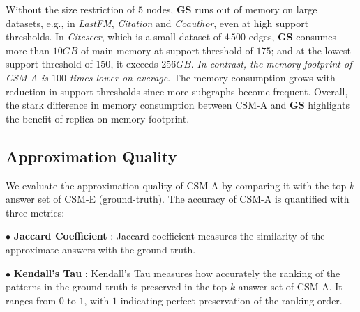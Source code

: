 Without the size restriction of $5$ nodes, \textbf{GS} runs out of memory on large datasets, e.g., in {\em LastFM}, {\em Citation} and {\em Coauthor}, even at high support thresholds. In {\em Citeseer}, which is a small dataset of $4\,500$ edges, \textbf{GS} consumes more than $10GB$ of main memory at support threshold of $175$; and at the lowest support threshold of $150$, it exceeds $256GB$. {\em In contrast, the memory footprint of {\sf CSM-A} is $100$ times lower on average}. The memory consumption grows with reduction in support thresholds since more subgraphs become frequent. Overall, the stark difference in memory consumption between {\sf CSM-A} and \textbf{GS} highlights the benefit of replica on memory footprint.%
\vspace{-0.1in}
\subsection{Approximation Quality}
\label{sec:quality}
We evaluate the approximation quality of {\sf CSM-A} by comparing it with the top-$k$ answer set of {\sf CSM-E} (ground-truth). The accuracy of {\sf CSM-A} is quantified with three metrics: %

$\bullet$ \textbf{Jaccard Coefficient} \cite{jaccard}: Jaccard coefficient measures the similarity of the approximate answers with the ground truth. %

$\bullet$ \textbf{Kendall's Tau} \cite{kendall}: Kendall's Tau measures how accurately the ranking of the patterns in the ground truth is preserved in the top-$k$ answer set of {\sf CSM-A}. %
It ranges from $0$ to $1$, with $1$ indicating perfect preservation of the ranking order. %

